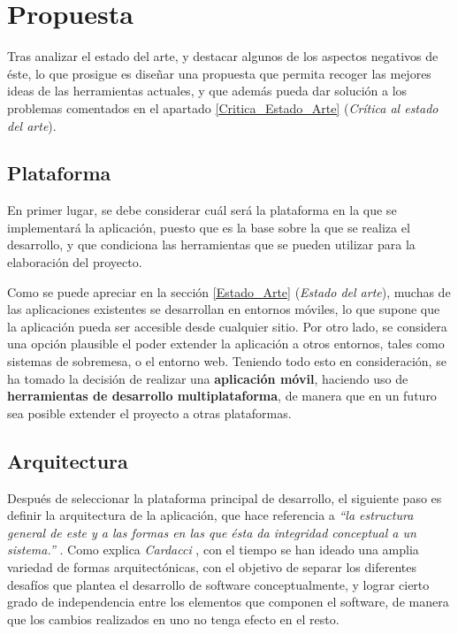 

\section{Propuesta} \label{Propuesta}
Tras analizar el estado del arte, y destacar algunos de los aspectos negativos de éste, lo que prosigue es diseñar una 
propuesta que permita recoger las mejores ideas de las herramientas actuales, y que además pueda dar solución a los 
problemas comentados en el apartado \ref{Critica_Estado_Arte} (\textit{Crítica al estado del arte}). \medskip

\subsection{Plataforma} \label{Plataforma}
En primer lugar, se debe considerar cuál será la plataforma en la que se implementará la aplicación, puesto que es la base 
sobre la que se realiza el desarrollo, y que condiciona las herramientas que se pueden utilizar para la elaboración del proyecto. 
\medskip

Como se puede apreciar en la sección \ref{Estado_Arte} (\textit{Estado del arte}), muchas de las aplicaciones existentes 
se desarrollan en entornos móviles, lo que supone que la aplicación pueda ser accesible desde cualquier sitio. Por otro lado, 
se considera una opción plausible el poder extender la aplicación a otros entornos, tales como sistemas de sobremesa, o el entorno 
web. Teniendo todo esto en consideración, se ha tomado la decisión de realizar una \textbf{aplicación móvil}, haciendo uso de 
\textbf{herramientas de desarrollo multiplataforma}, de manera que en un futuro sea posible extender el proyecto a otras plataformas.

\subsection{Arquitectura} \label{Arquitectura}
Después de seleccionar la plataforma principal de desarrollo, el siguiente paso es definir la arquitectura de la aplicación, 
que hace referencia a \textit{“la estructura general de este y a las formas en las que ésta da integridad conceptual a un 
sistema.”} \autocite*{Shaw1995}. Como explica \textit{Cardacci} \autocite*{Addati2013}, con el tiempo se han ideado una amplia 
variedad de formas arquitectónicas, con el objetivo de separar los diferentes desafíos que plantea el desarrollo de software 
conceptualmente, y lograr cierto grado de independencia entre los elementos que componen el software, de manera que los cambios 
realizados en uno no tenga efecto en el resto. \medskip

